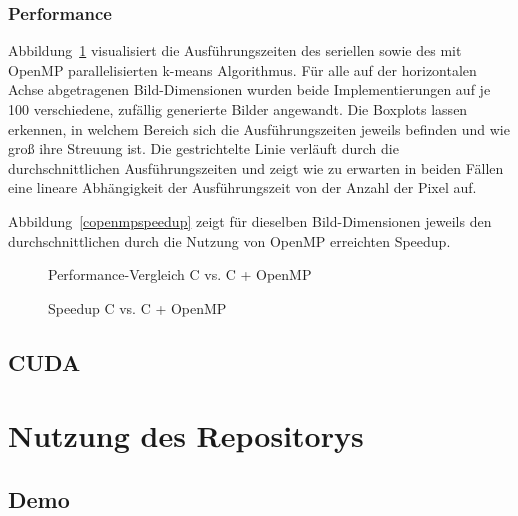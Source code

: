 \documentclass[
    bibliography=totoc, cd=lightcolor, cdmath=false, ngerman]{tudscrreprt}
\begin{document}
\inputminted[firstline=165, label=kmeansomp, highlightlines={
174, 180-181, 191-192, 204, 209-212, 241, 248-249, 254, 263-266, 268-271, 281,
284-286, 288}]{C}{c/src/kmeans.c}

\subsection{Performance}

Abbildung~\ref{img:copenmpboxplot} visualisiert die Ausführungszeiten des
seriellen sowie des mit OpenMP parallelisierten k-means Algorithmus. Für alle
auf der horizontalen Achse abgetragenen Bild-Dimensionen wurden beide
Implementierungen auf je 100 verschiedene, zufällig generierte Bilder
angewandt. Die Boxplots lassen erkennen, in welchem Bereich sich die
Ausführungszeiten jeweils befinden und wie groß ihre Streuung ist. Die
gestrichtelte Linie verläuft durch die durchschnittlichen Ausführungszeiten und
zeigt wie zu erwarten in beiden Fällen eine lineare Abhängigkeit der
Ausführungszeit von der Anzahl der Pixel auf.

Abbildung~\ref{copenmpspeedup} zeigt für dieselben Bild-Dimensionen jeweils den
durchschnittlichen durch die Nutzung von OpenMP erreichten Speedup.

\begin{figure}[h]
\centering

\caption{Performance-Vergleich C vs. C + OpenMP}
\label{img:copenmpboxplot}
\end{figure}

\begin{figure}[h]
\centering

\caption{Speedup C vs. C + OpenMP}
\label{img:copenmpspeedup}
\end{figure}

\section{CUDA}

\chapter{Nutzung des Repositorys}

\section{Demo}
\end{document}
